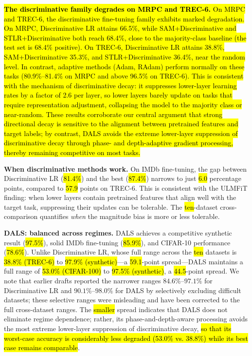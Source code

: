 \documentclass[a4paper,fleqn]{cas-dc}
\begin{document}
\hl{\textbf{The discriminative family degrades on MRPC and TREC-6.} On MRPC and TREC-6, the discriminative fine-tuning family exhibits marked degradation. On MRPC, Discriminative LR attains 66.5\%, while SAM+Discriminative and STLR+Discriminative both reach 68.4\%, close to the majority-class baseline (the test set is 68.4\% positive). On TREC-6, Discriminative LR attains 38.8\%, SAM+Discriminative 35.3\%, and STLR+Discriminative 36.4\%, near the random level. In contrast, adaptive methods (Adam, RAdam) perform normally on these tasks (80.9\%--81.4\% on MRPC and above 96.5\% on TREC-6). This is consistent with the mechanism of discriminative decay: it suppresses lower-layer learning rates by a factor of 2.6 per layer, so lower layers barely update on tasks that require representation adjustment, collapsing the model to the majority class or near-random. These results corroborate our central argument that strong directional decay is sensitive to the alignment between pretrained features and target labels; by contrast, DALS avoids the extreme lower-layer suppression of discriminative decay through phase- and depth-adaptive gradient processing, thereby remaining competitive on most tasks.}

\textbf{When discriminative methods work.} On IMDb fine-tuning, the gap between Discriminative LR (\hl{81.4\%}) and the best (\hl{87.4\%}) narrows to just \hl{6.0} percentage points, compared to \hl{57.9} points on TREC-6. This is consistent with the ULMFiT finding: when lower layers contain pretrained features that align well with the target task, suppressing their updates can be tolerable. The \hl{ten}-dataset cross-comparison quantifies \emph{when} the magnitude bias is more or less tolerable.

\textbf{DALS: balanced across regimes.} DALS achieves a competitive synthetic result (\hl{97.5\%}), solid IMDb fine-tuning (\hl{85.9\%}), and CIFAR-10 performance (\hl{78.6\%}). Unlike Discriminative LR, whose full range across the \hl{ten} datasets is \hl{38.8\% (TREC-6)} to \hl{97.9\% (synthetic)}---a \hl{59.1}-point spread---DALS maintains a full range of \hl{53.0\% (CIFAR-100)} to \hl{97.5\% (synthetic)}, a \hl{44.5}-point spread. We note that earlier drafts reported the narrower ranges $84.6\%$--$97.1\%$ for Discriminative LR and $90.1\%$--$98.0\%$ for DALS by selectively excluding difficult datasets; these selective ranges were misleading and have been corrected to the full cross-dataset ranges. The \hl{smaller} spread indicates that DALS does not eliminate regime dependence; rather, its phase-and-depth-aware processing avoids the most extreme lower-layer suppression of discriminative decay, \hl{so that its worst-case accuracy is considerably less degraded (53.0\% vs. 38.8\%) while its best case remains comparable}.
\end{document}

